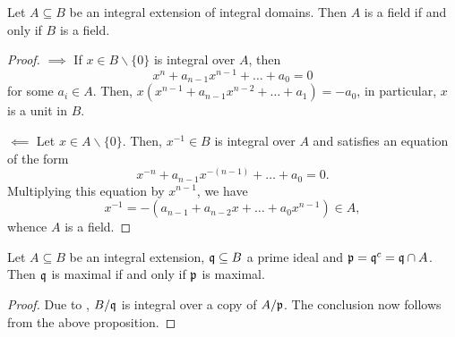 \begin{proposition}
    Let $A\subseteq B$ be an integral extension of integral domains. Then $A$ is a field if and only if $B$ is a field.
\end{proposition}
\begin{proof}
    $\implies$ If $x\in B\backslash\{0\}$ is integral over $A$, then 
    \begin{equation*}
        x^n + a_{n - 1}x^{n - 1} + \dots + a_0 = 0
    \end{equation*}
    for some $a_i\in A$. Then, $x(x^{n - 1} + a_{n - 1}x^{n - 2} + \dots + a_1) = -a_0$, in particular, $x$ is a unit in $B$.

    $\impliedby$ Let $x\in A\backslash\{0\}$. Then, $x^{-1}\in B$ is integral over $A$ and satisfies an equation of the form 
    \begin{equation*}
        x^{-n} + a_{n - 1}x^{-(n - 1)} + \dots + a_0 = 0.
    \end{equation*}
    Multiplying this equation by $x^{n - 1}$, we have 
    \begin{equation*}
        x^{-1} = -(a_{n - 1} + a_{n - 2}x + \dots + a_0x^{n - 1})\in A,
    \end{equation*}
    whence $A$ is a field.
\end{proof}

\begin{proposition}
    Let $A\subseteq B$ be an integral extension, $\mathfrak q\subseteq B$ a prime ideal and $\mathfrak p = \mathfrak q^c = \mathfrak q\cap A$. Then $\mathfrak q$ is maximal if and only if $\mathfrak p$ is maximal.
\end{proposition}
\begin{proof}
    Due to , $B/\mathfrak q$ is integral over a copy of $A/\mathfrak p$. The conclusion now follows from the above proposition.
\end{proof}

